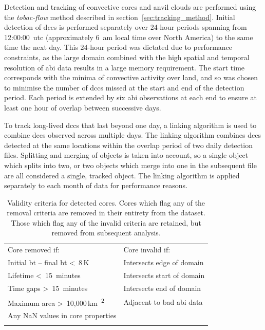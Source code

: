 Detection and tracking of convective cores and anvil clouds are performed using the \textit{tobac-flow} method \citep{jones_semi-lagrangian_2023} described in section~\ref{sec:tracking_method}.
Initial detection of \acrshort{dcc}s is performed separately over 24-hour periods spanning from 12:00:00~\acrshort{utc} (approximately 6~am local time over North America) to the same time the next day.
This 24-hour period was dictated due to performance constraints, as the large domain combined with the high spatial and temporal resolution of \acrshort{abi} data results in a large memory requirement.
The start time corresponds with the minima of convective activity over land, and so was chosen to minimise the number of \acrshort{dcc}s missed at the start and end of the detection period.
Each period is extended by six \acrshort{abi} observations at each end to ensure at least one hour of overlap between successive days.

To track long-lived \acrshort{dcc}s that last beyond one day, a linking algorithm is used to combine \acrshort{dcc}s observed across multiple days.
The linking algorithm combines \acrshort{dcc}s detected at the same locations within the overlap period of two daily detection files.
Splitting and merging of objects is taken into account, so a single object which splits into two, or two objects which merge into one in the subsequent file are all considered a single, tracked object.
The linking algorithm is applied separately to each month of data for performance reasons.

\begin{table}[b]
\centering
\begin{tabular}{ll}
\tophline
Core removed if:                                                    & Core invalid if: \\
\middlehline
Initial \acrshort{bt} -- final \acrshort{bt} \textless~8\,\unit{K}  & Intersects edge of domain \\
Lifetime \textless~15~minutes                                       & Intersects start of domain \\
Time gaps \textgreater~15~minutes                                   & Intersects end of domain \\
Maximum area \textgreater~10,000\,\unit{km\textsuperscript{2}}      & Adjacent to bad \acrshort{abi} data \\
Any NaN values in core properties                                   & \\
\bottomhline
\end{tabular}
\caption[
Validity criteria for detected cores
]{
Validity criteria for detected cores. Cores which flag any of the removal criteria are removed in their entirety from the dataset. Those which flag any of the invalid criteria are retained, but removed from subsequent analysis.}
\label{table:core_validity_criteria}
\end{table}

